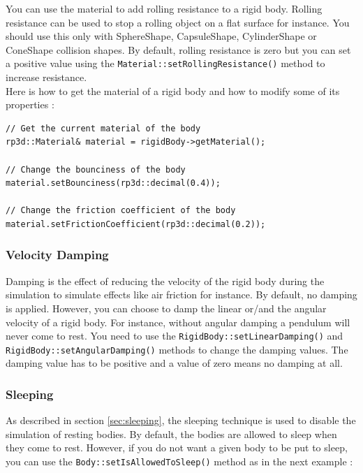 \documentclass[a4paper,12pt]{article}
\begin{document}
    You can use the material to add rolling resistance to a rigid body. Rolling resistance can be used to stop
    a rolling object on a flat surface for instance. You should use this only with SphereShape,
    CapsuleShape, CylinderShape or ConeShape collision shapes. By default, rolling resistance is zero but you can
    set a positive value using the \texttt{Material::setRollingResistance()} method to increase resistance. \\

    Here is how to get the material of a rigid body and how to modify some of its properties : \\

    \begin{lstlisting}
// Get the current material of the body
rp3d::Material& material = rigidBody->getMaterial();

// Change the bounciness of the body
material.setBounciness(rp3d::decimal(0.4));

// Change the friction coefficient of the body
material.setFrictionCoefficient(rp3d::decimal(0.2));
  \end{lstlisting}

    \subsubsection{Velocity Damping}

    \begin{sloppypar}
      Damping is the effect of reducing the velocity of the rigid body during the simulation to simulate effects like air friction for instance. By default, no damping
      is applied. However, you can choose to damp the linear or/and the angular velocity of a rigid body. For instance, without angular damping a pendulum will never come
      to rest. You need to use the \texttt{RigidBody::setLinearDamping()} and \texttt{RigidBody::setAngularDamping()} methods to change the damping values. The damping
      value has to be positive and a value of zero means no damping at all.
    \end{sloppypar}

    \subsubsection{Sleeping}
    \label{sec:rigidbodysleeping}

    As described in section \ref{sec:sleeping}, the sleeping technique is used to disable the simulation of resting bodies. By default, the bodies are allowed to sleep
    when they come to rest. However, if you do not want a given body to be put to sleep, you can use the \texttt{Body::setIsAllowedToSleep()} method as in the next example : \\
\end{document}

